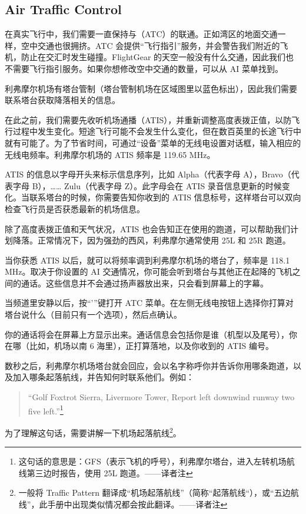 \subsection{Air Traffic Control}

在真实飞行中，我们需要一直保持与（ATC）的联通。正如湾区的地面交通一样，空中交通也很拥挤。ATC 会提供“飞行指引”服务，并会警告我们附近的飞机，防止在交汇时发生碰撞。FlightGear 的天空一般没有什么交通，因此我们也不需要飞行指引服务。如果你想修改空中交通的数量，可以从 AI 菜单找到。

利弗摩尔机场有塔台管制（塔台管制机场在区域图里以蓝色标出），因此我们需要联系塔台获取降落相关的信息。

在此之前，我们需要先收听机场通播（ATIS），并重新调整高度表拨正值，以防飞行过程中发生变化。短途飞行可能不会发生什么变化，但在数百英里的长途飞行中就有可能了。为了节省时间，可通过“设备”菜单的无线电设置对话框，输入相应的无线电频率。利弗摩尔机场的 ATIS 频率是 119.65 MHz。

ATIS 的信息以字母开头来标示信息序列，比如 Alpha（代表字母 A），Bravo（代表字母 B），…… Zulu（代表字母 Z）。此字母会在 ATIS 录音信息更新的时候变化。当联系塔台的时候，你需要告知你收到的 ATIS 信息标号，这样塔台可以双向检查飞行员是否获悉最新的机场信息。

除了高度表拨正值和天气状况，ATIS 也会告知正在使用的跑道，可以帮助我们计划降落。正常情况下，因为强劲的西风，利弗摩尔通常使用 25L 和 25R 跑道。

当你获悉 ATIS 以后，就可以将频率调到利弗摩尔机场的塔台了，频率是 118.1 MHz。取决于你设置的 AI 交通情况，你可能会听到塔台与其他正在起降的飞机之间的通话。这些信息并不会通过扬声器放出来，只会看到屏幕上的字幕。

当频道里安静以后，按“'”键打开 ATC 菜单。在左侧无线电按钮上选择你打算对塔台说什么（目前只有一个选项），然后点确认。

你的通话将会在屏幕上方显示出来。通话信息会包括你是谁（机型以及尾号），你在哪（比如，机场以南 6 海里），正打算落地，以及你收到的 ATIS 编号。

数秒之后，利弗摩尔机场塔台就会回应，会以名字称呼你并告诉你用哪条跑道，以及加入哪条起落航线，并告知何时联系他们。例如：

\begin{quote}
``Golf Foxtrot Sierra, Livermore Tower, Report left downwind runway two five left.''\footnote{这句话的意思是：GFS（表示飞机的呼号），利弗摩尔塔台，进入左转机场航线第三边时报告，使用 25L 跑道。——译者注}
\end{quote}

为了理解这句话，需要讲解一下机场起落航线\footnote{一般将 Traffic Pattern 翻译成“机场起落航线”（简称“起落航线“），或“五边航线”，此手册中出现类似情况都会按此翻译。——译者注}。

